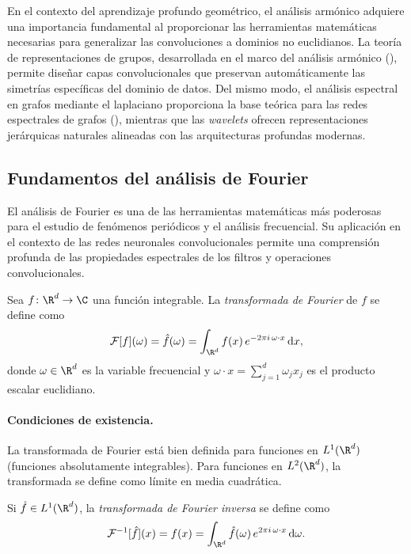En el contexto del aprendizaje profundo geom\'etrico, el an\'alisis arm\'onico
adquiere una importancia fundamental al proporcionar las herramientas
matem\'aticas necesarias para generalizar las convoluciones a dominios no
euclidianos. La teor\'ia de representaciones de grupos, desarrollada en el marco
del an\'alisis arm\'onico (), permite dise\~nar capas
convolucionales que preservan autom\'aticamente las simetr\'ias espec\'ificas
del dominio de datos. Del mismo modo, el an\'alisis espectral en grafos mediante
el laplaciano proporciona la base te\'orica para las redes espectrales de grafos
(), mientras que las \emph{wavelets} ofrecen representaciones
jer\'arquicas naturales alineadas con las arquitecturas profundas modernas.

\subsection{Fundamentos del an\'alisis de Fourier}
\label{sec:grids:fourier-foundations}

El an\'alisis de Fourier es una de las herramientas matem\'aticas m\'as
poderosas para el estudio de fen\'omenos peri\'odicos y el an\'alisis
frecuencial. Su aplicaci\'on en el contexto de las redes neuronales
convolucionales permite una comprensi\'on profunda de las propiedades
espectrales de los filtros y operaciones convolucionales.

\begin{definition}
\label{def:grids:fourier}
Sea $f \colon \R^d \to \C$ una funci\'on integrable. La \emph{transformada de
Fourier} de $f$ se define como
\[
  \Ft[f](\omega) = \hat{f}(\omega)
   = \int_{\R^d} f(x)\, e^{-2\pi i\, \omega \cdot x}\, \mathrm{d}x,
\]
donde $\omega \in \R^d$ es la variable frecuencial y
$\omega \cdot x = \sum_{j=1}^d \omega_j x_j$ es el producto escalar euclidiano.
\end{definition}

\paragraph{Condiciones de existencia.}
La transformada de Fourier est\'a bien definida para funciones en $L^1(\R^d)$
(funciones absolutamente integrables). Para funciones en $L^2(\R^d)$, la
transformada se define como l\'imite en media cuadr\'atica.

\begin{definition}
\label{def:grids:fourier-inverse}
Si $\hat{f} \in L^1(\R^d)$, la \emph{transformada de Fourier inversa} se define
como
\[
  \Ft^{-1}[\hat{f}](x) = f(x)
   = \int_{\R^d} \hat{f}(\omega)\, e^{2\pi i\, \omega \cdot x}\, \mathrm{d}\omega.
\]
\end{definition}

